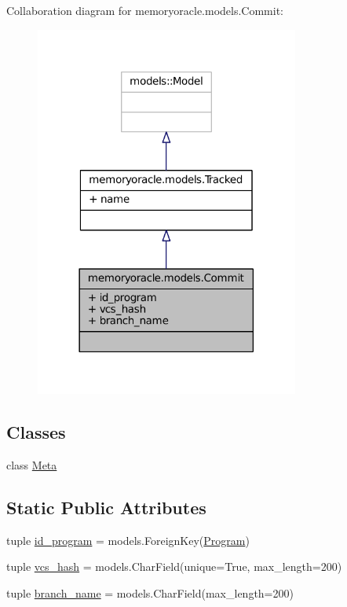 Collaboration diagram for memoryoracle.\+models.\+Commit\+:\nopagebreak
\begin{figure}[H]
\begin{center}
\leavevmode
\includegraphics[width=246pt]{classmemoryoracle_1_1models_1_1Commit__coll__graph}
\end{center}
\end{figure}
\subsection*{Classes}
\begin{DoxyCompactItemize}
\item 
class \hyperlink{classmemoryoracle_1_1models_1_1Commit_1_1Meta}{Meta}
\end{DoxyCompactItemize}
\subsection*{Static Public Attributes}
\begin{DoxyCompactItemize}
\item 
tuple \hyperlink{classmemoryoracle_1_1models_1_1Commit_a874612ef3353692531dbdde8f1a17609}{id\+\_\+program} = models.\+Foreign\+Key(\hyperlink{classmemoryoracle_1_1models_1_1Program}{Program})
\item 
tuple \hyperlink{classmemoryoracle_1_1models_1_1Commit_a6c92b2816250c6dfc2ae6f67e94fa472}{vcs\+\_\+hash} = models.\+Char\+Field(unique=True, max\+\_\+length=200)
\item 
tuple \hyperlink{classmemoryoracle_1_1models_1_1Commit_a1ac382bebfef4bd3e24548ad08cda47a}{branch\+\_\+name} = models.\+Char\+Field(max\+\_\+length=200)
\end{DoxyCompactItemize}


